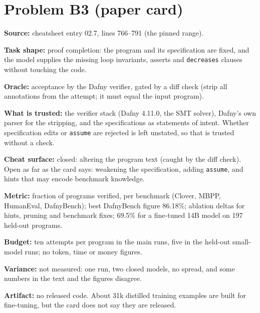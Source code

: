 \documentclass[11pt]{article}
\begin{document}
\section*{Problem B3 (paper card)}\label{ans:B3}
\begin{answer}
\textbf{Source:} cheatsheet entry 02.7, lines 766--791 (the pinned range).

\textbf{Task shape:} proof completion: the program and its specification are
fixed, and the model supplies the missing loop invariants, asserts and
\texttt{decreases} clauses without touching the code.

\textbf{Oracle:} acceptance by the Dafny verifier, gated by a diff check (strip
all annotations from the attempt; it must equal the input program).

\textbf{What is trusted:} the verifier stack (Dafny 4.11.0, the SMT solver),
Dafny's own parser for the stripping, and the specifications as statements of
intent. Whether specification edits or \texttt{assume} are rejected is left
unstated, so that is trusted without a check.

\textbf{Cheat surface:} closed: altering the program text (caught by the diff
check). Open as far as the card says: weakening the specification, adding
\texttt{assume}, and hints that may encode benchmark knowledge.

\textbf{Metric:} fraction of programs verified, per benchmark (Clover, MBPP,
HumanEval, DafnyBench); best DafnyBench figure 86.18\%; ablation deltas for
hints, pruning and benchmark fixes; 69.5\% for a fine-tuned 14B model on
197 held-out programs.

\textbf{Budget:} ten attempts per program in the main runs, five in the
held-out small-model runs; no token, time or money figures.

\textbf{Variance:} not measured: one run, two closed models, no spread, and some
numbers in the text and the figures disagree.

\textbf{Artifact:} no released code. About 31k distilled training examples are
built for fine-tuning, but the card does not say they are released.
\end{answer}
\end{document}
